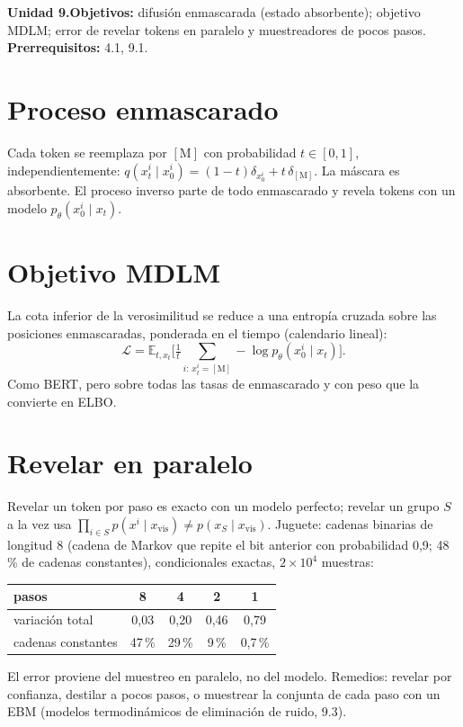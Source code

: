 \documentclass[11pt,a4paper]{article}
\begin{document}

\noindent\textbf{Unidad 9.}\quad\textbf{Objetivos:} difusión enmascarada (estado absorbente); objetivo MDLM; error de revelar tokens en paralelo y muestreadores de pocos pasos.
\textbf{Prerrequisitos:} 4.1, 9.1.

\section{Proceso enmascarado}
Cada token se reemplaza por $[\mathrm M]$ con probabilidad $t\in[0,1]$, independientemente: $q(x_t^i\mid x_0^i)=(1-t)\delta_{x_0^i}+t\,\delta_{[\mathrm M]}$. La máscara es absorbente.
El proceso inverso parte de todo enmascarado y revela tokens con un modelo $p_\theta(x_0^i\mid x_t)$.

\section{Objetivo MDLM}
La cota inferior de la verosimilitud se reduce a una entropía cruzada sobre las posiciones enmascaradas, ponderada en el tiempo (calendario lineal):
\[\mathcal L=\mathbb E_{t,x_t}\Big[\tfrac1t\textstyle\sum_{i:\,x_t^i=[\mathrm M]}-\log p_\theta(x_0^i\mid x_t)\Big].\]
Como BERT, pero sobre todas las tasas de enmascarado y con peso que la convierte en ELBO.

\section{Revelar en paralelo \evS}
Revelar un token por paso es exacto con un modelo perfecto; revelar un grupo $S$ a la vez usa $\prod_{i\in S}p(x^i\mid x_{\text{vis}})\ne p(x_S\mid x_{\text{vis}})$.
Juguete: cadenas binarias de longitud 8 (cadena de Markov que repite el bit anterior con probabilidad 0,9; 48\,\% de cadenas constantes), condicionales exactas,
$2\times10^4$ muestras:
\begin{center}\begin{tabular}{lcccc}\toprule
pasos & 8 & 4 & 2 & 1\\\midrule
variación total & 0,03 & 0,20 & 0,46 & 0,79\\
cadenas constantes & 47\,\% & 29\,\% & 9\,\% & 0,7\,\%\\\bottomrule\end{tabular}\end{center}
El error proviene del muestreo en paralelo, no del modelo. Remedios: revelar por confianza, destilar a pocos pasos, o muestrear la conjunta de cada paso con un EBM
(modelos termodinámicos de eliminación de ruido, 9.3).
\end{document}
